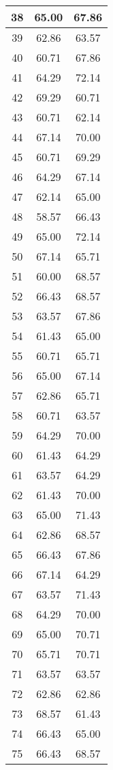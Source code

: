 \documentclass[11pt]{article}
\begin{document}
\begin{longtable}[c]{| c | c |c |}
38 & 65.00 & 67.86 \\ \hline
39 & 62.86 & 63.57 \\ \hline
40 & 60.71 & 67.86 \\ \hline
41 & 64.29 & 72.14 \\ \hline
42 & 69.29 & 60.71 \\ \hline
43 & 60.71 & 62.14 \\ \hline
44 & 67.14 & 70.00 \\ \hline
45 & 60.71 & 69.29 \\ \hline
46 & 64.29 & 67.14 \\ \hline
47 & 62.14 & 65.00 \\ \hline
48 & 58.57 & 66.43 \\ \hline
49 & 65.00 & 72.14 \\ \hline
50 & 67.14 & 65.71 \\ \hline
51 & 60.00 & 68.57 \\ \hline
52 & 66.43 & 68.57 \\ \hline
53 & 63.57 & 67.86 \\ \hline
54 & 61.43 & 65.00 \\ \hline
55 & 60.71 & 65.71 \\ \hline
56 & 65.00 & 67.14 \\ \hline
57 & 62.86 & 65.71 \\ \hline
58 & 60.71 & 63.57 \\ \hline
59 & 64.29 & 70.00 \\ \hline
60 & 61.43 & 64.29 \\ \hline
61 & 63.57 & 64.29 \\ \hline
62 & 61.43 & 70.00 \\ \hline
63 & 65.00 & 71.43 \\ \hline
64 & 62.86 & 68.57 \\ \hline
65 & 66.43 & 67.86 \\ \hline
66 & 67.14 & 64.29 \\ \hline
67 & 63.57 & 71.43 \\ \hline
68 & 64.29 & 70.00 \\ \hline
69 & 65.00 & 70.71 \\ \hline
70 & 65.71 & 70.71 \\ \hline
71 & 63.57 & 63.57 \\ \hline
72 & 62.86 & 62.86 \\ \hline
73 & 68.57 & 61.43 \\ \hline
74 & 66.43 & 65.00 \\ \hline
75 & 66.43 & 68.57 \\ \hline

\end{longtable}
\end{document}
